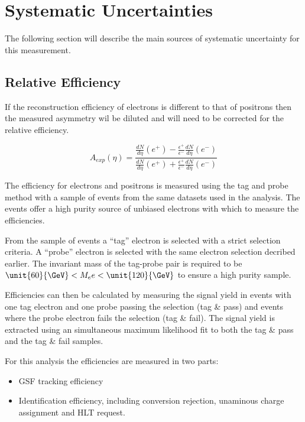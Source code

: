 \section{Systematic Uncertainties}
The following section will describe the main sources of systematic uncertainty
for this measurement. 

\subsection{Relative Efficiency}

If the reconstruction efficiency of electrons is different to that of positrons
then the measured asymmetry wil be diluted and will need to be corrected for
the relative efficiency.

\begin{equation}
A_{exp}(\eta) = \frac{
                    \frac{dN}{d\eta}(e^+)-
                    \frac{\epsilon^+}{\epsilon^-}\frac{dN}{d\eta}(e^-)
                }
                {
                    \frac{dN}{d\eta}(e^+)+
                    \frac{\epsilon^+}{\epsilon^-}\frac{dN}{d\eta}(e^-)
                }
\end{equation}

The efficiency for electrons and positrons is measured using the tag and probe
method 
with a sample of \Zee events from the same datasets used in the analysis. 
The \Zee events offer a high purity source of unbiased electrons with which to
measure the efficiencies.

From the sample of \Zee events a ``tag'' electron is selected with a strict
selection criteria. 
A ``probe'' electron is selected with the same electron selection decribed
earlier.
The invariant mass of the tag-probe pair is required to be
$\unit{60}{\GeV} < M_ee < \unit{120}{\GeV}$ to ensure a high purity sample.

Efficiencies can then be calculated by measuring the signal yield in events
with one tag electron and one probe passing the selection (tag \& pass) and
events where the probe electron fails the selection (tag \& fail).
The signal yield is extracted using an simultaneous maximum likelihood fit to
both the tag \& pass and the tag \& fail samples.

For this analysis the efficiencies are measured in two parts:

\begin{itemize}
    \item GSF tracking efficiency
    \item Identification efficiency, including conversion rejection, unaminous
charge assignment and HLT request.
\end{itemize}

